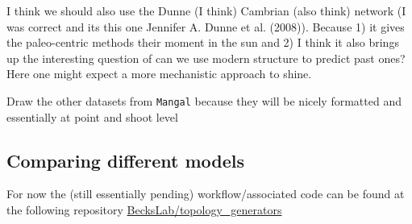 \documentclass[
]{agujournal2019}
\begin{document}
I think we should also use the Dunne (I think) Cambrian (also think)
network (I was correct and its this one Jennifer A. Dunne et al.
(2008)). Because 1) it gives the paleo-centric methods their moment in
the sun and 2) I think it also brings up the interesting question of can
we use modern structure to predict past ones? Here one might expect a
more mechanistic approach to shine.

Draw the other datasets from \texttt{Mangal} because they will be nicely
formatted and essentially at point and shoot level

\subsection{Comparing different
models}\label{comparing-different-models}

For now the (still essentially pending) workflow/associated code can be
found at the following repository
\href{https://github.com/BecksLab/topology_generators}{BecksLab/topology\_generators}
\end{document}
